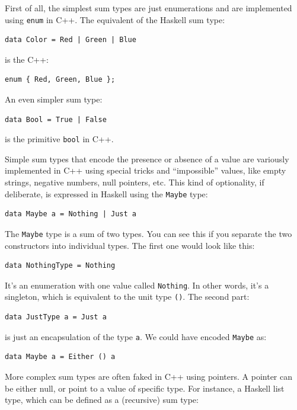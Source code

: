 First of all, the simplest sum types are just enumerations and are
implemented using \texttt{enum} in C++. The equivalent of the Haskell
sum type:

\begin{verbatim}
data Color = Red | Green | Blue
\end{verbatim}

is the C++:

\begin{verbatim}
enum { Red, Green, Blue };
\end{verbatim}

An even simpler sum type:

\begin{verbatim}
data Bool = True | False
\end{verbatim}

is the primitive \texttt{bool} in C++.

Simple sum types that encode the presence or absence of a value are
variously implemented in C++ using special tricks and ``impossible''
values, like empty strings, negative numbers, null pointers, etc. This
kind of optionality, if deliberate, is expressed in Haskell using the
\texttt{Maybe} type:

\begin{verbatim}
data Maybe a = Nothing | Just a
\end{verbatim}

The \texttt{Maybe} type is a sum of two types. You can see this if you
separate the two constructors into individual types. The first one would
look like this:

\begin{verbatim}
data NothingType = Nothing
\end{verbatim}

It's an enumeration with one value called \texttt{Nothing}. In other
words, it's a singleton, which is equivalent to the unit type
\texttt{()}. The second part:

\begin{verbatim}
data JustType a = Just a
\end{verbatim}

is just an encapsulation of the type \texttt{a}. We could have encoded
\texttt{Maybe} as:

\begin{verbatim}
data Maybe a = Either () a
\end{verbatim}

More complex sum types are often faked in C++ using pointers. A pointer
can be either null, or point to a value of specific type. For instance,
a Haskell list type, which can be defined as a (recursive) sum type:

